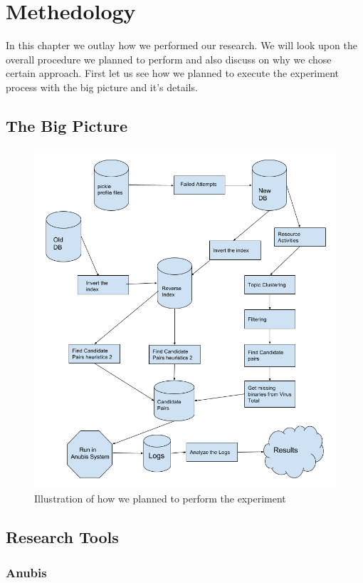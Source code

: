 \chapter{Methedology}\label{chapter:methedology}
In this chapter we outlay how we performed our research.
We will look upon the overall procedure we planned to perform and also discuss on why we chose certain approach.
First let us see how we planned to execute the experiment process with the big picture and it's details.
\section{The Big Picture}
\begin{figure}[htbp]
  \centering
  \includegraphics[scale=0.4]{figures/bigpicture.png}
  \caption[Big Picture]{Illustration of how we planned to perform the experiment}\label{fig:bigpicture}
\end{figure}
\section{Research Tools}
\label{sec:Research Tools}
\subsection{Anubis}
\label{sub:Anubis}
